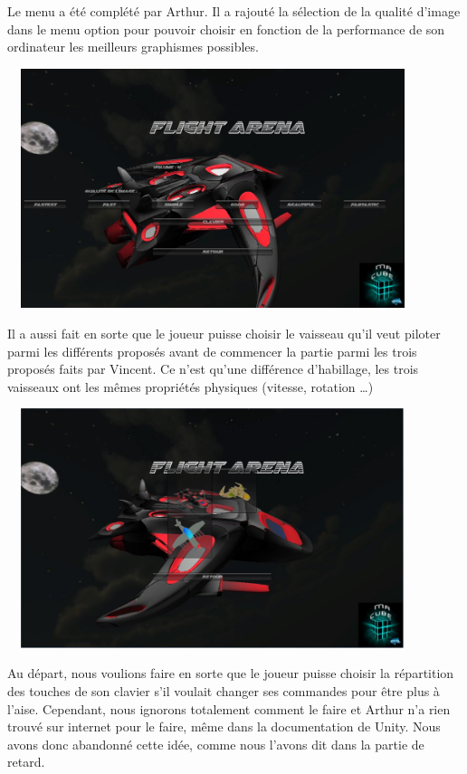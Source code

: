 \documentclass[10pt, titlepage]{report}
\begin{document}
Le menu a été complété par Arthur. Il a rajouté la sélection de la qualité d'image dans le menu option pour pouvoir choisir en fonction de la performance de son ordinateur les meilleurs graphismes possibles.\\

\begin{center}
\includegraphics[height=7cm, width=12cm]{menu_option.jpg}
\end{center}

Il a aussi fait en sorte que le joueur puisse choisir le vaisseau qu'il veut piloter parmi les différents proposés avant de commencer la partie parmi les trois proposés faits par Vincent. Ce n'est qu'une différence d'habillage, les trois vaisseaux ont les mêmes propriétés physiques (vitesse, rotation \dots )\\

\begin{center}
\includegraphics[height=7cm, width=12cm]{menu_selection.jpg}
\end{center}

Au départ, nous voulions faire en sorte que le joueur puisse choisir la répartition des touches de son clavier s'il voulait changer ses commandes pour être plus à l'aise. Cependant, nous ignorons totalement comment le faire et Arthur n'a rien trouvé sur internet pour le faire, même dans la documentation de Unity. Nous avons donc abandonné cette idée, comme nous l'avons dit dans la partie de retard.\\
\end{document}
